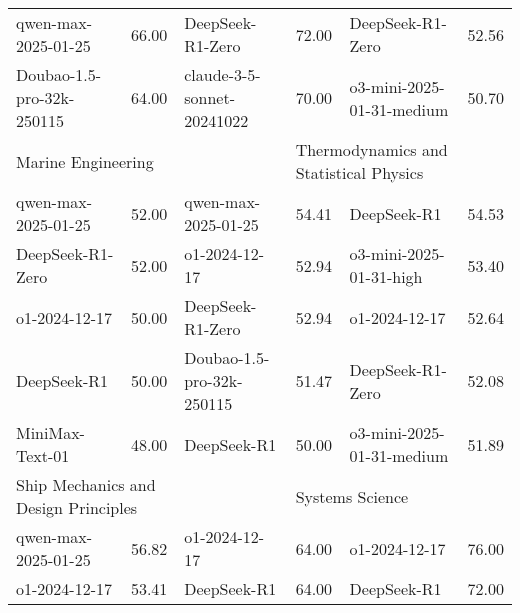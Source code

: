 {\begin{longtable}{p{4.2cm}>{\centering\arraybackslash} p{0.8cm}|p{4.2cm} >{\centering\arraybackslash} p{0.8cm}|p{4.2cm} >{\centering\arraybackslash} p{0.8cm}}
\cellcolor{blue!5} qwen-max-2025-01-25 & \cellcolor{blue!2}66.00 & \cellcolor{yellow!5} DeepSeek-R1-Zero & \cellcolor{yellow!2} 72.00 & \cellcolor{green!5} DeepSeek-R1-Zero & \cellcolor{green!2} 52.56\\
\cellcolor{blue!5} Doubao-1.5-pro-32k-250115 & \cellcolor{blue!2}64.00 & \cellcolor{yellow!5} claude-3-5-sonnet-20241022 & \cellcolor{yellow!2} 70.00 & \cellcolor{green!5} o3-mini-2025-01-31-medium & \cellcolor{green!2} 50.70\\
\hline
\multicolumn{2}{p{5.15cm}|}{\cellcolor{blue!10} \centering Marine Engineering} & \multicolumn{2}{p{5.15cm}|}{\cellcolor{yellow!10} \centering Surgery} & \multicolumn{2}{p{5.15cm}}{\cellcolor{green!10} \centering Thermodynamics and Statistical Physics}\\
\hline
\cellcolor{blue!5} qwen-max-2025-01-25 & \cellcolor{blue!2}52.00 & \cellcolor{yellow!5} qwen-max-2025-01-25 & \cellcolor{yellow!2} 54.41 & \cellcolor{green!5} DeepSeek-R1 & \cellcolor{green!2} 54.53\\
\cellcolor{blue!5} DeepSeek-R1-Zero & \cellcolor{blue!2}52.00 & \cellcolor{yellow!5} o1-2024-12-17 & \cellcolor{yellow!2} 52.94 & \cellcolor{green!5} o3-mini-2025-01-31-high & \cellcolor{green!2} 53.40\\
\cellcolor{blue!5} o1-2024-12-17 & \cellcolor{blue!2}50.00 & \cellcolor{yellow!5} DeepSeek-R1-Zero & \cellcolor{yellow!2} 52.94 & \cellcolor{green!5} o1-2024-12-17 & \cellcolor{green!2} 52.64\\
\cellcolor{blue!5} DeepSeek-R1 & \cellcolor{blue!2}50.00 & \cellcolor{yellow!5} Doubao-1.5-pro-32k-250115 & \cellcolor{yellow!2} 51.47 & \cellcolor{green!5} DeepSeek-R1-Zero & \cellcolor{green!2} 52.08\\
\cellcolor{blue!5} MiniMax-Text-01 & \cellcolor{blue!2}48.00 & \cellcolor{yellow!5} DeepSeek-R1 & \cellcolor{yellow!2} 50.00 & \cellcolor{green!5} o3-mini-2025-01-31-medium & \cellcolor{green!2} 51.89\\
\hline
\multicolumn{2}{p{5.15cm}|}{\cellcolor{blue!10} \centering Ship Mechanics and Design Principles} & \multicolumn{2}{p{5.15cm}|}{\cellcolor{yellow!10} \centering Medicinal Chemistry} & \multicolumn{2}{p{5.15cm}}{\cellcolor{green!10} \centering Systems Science}\\
\hline
\cellcolor{blue!5} qwen-max-2025-01-25 & \cellcolor{blue!2}56.82 & \cellcolor{yellow!5} o1-2024-12-17 & \cellcolor{yellow!2} 64.00 & \cellcolor{green!5} o1-2024-12-17 & \cellcolor{green!2} 76.00\\
\cellcolor{blue!5} o1-2024-12-17 & \cellcolor{blue!2}53.41 & \cellcolor{yellow!5} DeepSeek-R1 & \cellcolor{yellow!2} 64.00 & \cellcolor{green!5} DeepSeek-R1 & \cellcolor{green!2} 72.00\\

\end{longtable}}
